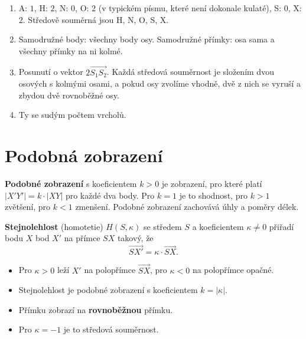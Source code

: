 \begin{solution}
  \begin{enumerate}[label=(\alph*)]
    \item A: $1$, H: $2$, N: $0$, O: $2$ (v typickém písmu, které není dokonale kulaté), S: $0$, X: $2$. Středově souměrná jsou H, N, O, S, X.
    \item Samodružné body: všechny body osy. Samodružné přímky: osa sama a všechny přímky na ni kolmé.
    \item Posunutí o vektor $2\overrightarrow{S_1S_2}$. Každá středová souměrnost je složením dvou osových s kolmými osami, a pokud osy zvolíme vhodně, dvě z nich se vyruší a zbydou dvě rovnoběžné osy.
    \item Ty se sudým počtem vrcholů.
  \end{enumerate}
\end{solution}

\section{Podobná zobrazení}\label{sec:podobna-zobrazeni}

\begin{definitionbox}
  \textbf{Podobné zobrazení} s koeficientem $k > 0$ je zobrazení, pro které platí $|X'Y'| = k\cdot|XY|$ pro každé dva body. Pro $k = 1$ je to shodnost, pro $k > 1$ zvětšení, pro $k < 1$ zmenšení. Podobné zobrazení zachovává úhly a poměry délek.

  \vspace{0.2cm}

  \textbf{Stejnolehlost} (homotetie) $H(S, \kappa)$ se středem $S$ a koeficientem $\kappa\neq 0$ přiřadí bodu $X$ bod $X'$ na přímce $SX$ takový, že
  \begin{equation*}
    \overrightarrow{SX'} = \kappa\cdot\overrightarrow{SX}.
  \end{equation*}
  \begin{itemize}
    \item Pro $\kappa > 0$ leží $X'$ na polopřímce $\overrightarrow{SX}$, pro $\kappa < 0$ na polopřímce opačné.
    \item Stejnolehlost je podobné zobrazení s koeficientem $k = |\kappa|$.
    \item Přímku zobrazí na \textbf{rovnoběžnou} přímku.
    \item Pro $\kappa = -1$ je to středová souměrnost.
  \end{itemize}
\end{definitionbox}

